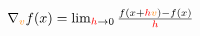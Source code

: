 \documentclass[crop,equation,convert={outext=.svg,command=\unexpanded{pdf2svg \infile\space\outfile}},multi=false]{standalone}
\begin{document}
\color{white}
\Large
    $\nabla_{\color{orange}v} f(x) = \lim_{{\color{red}h}\to 0}\frac{f(x+{\color{red}h}{\color{orange}v})-f(x)}{{\color{red}h}}$
\end{document}
